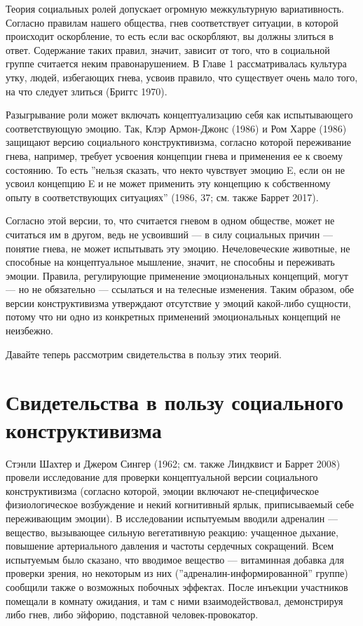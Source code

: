 \documentclass[11pt]{book}
\begin{document}
Теория социальных ролей допускает огромную межкультурную вариативность. Согласно правилам нашего общества, гнев соответствует ситуации, в которой происходит оскорбление, то есть если вас оскорбляют, вы должны злиться в ответ. Содержание таких правил, значит, зависит от того, что в социальной группе считается неким правонарушением. В Главе 1 рассматривалась культура утку, людей, избегающих гнева, усвоив правило, что существует очень мало того, на что следует злиться (Бриггс 1970).

Разыгрывание роли может включать концептуализацию себя как испытывающего соответствующую эмоцию. Так, Клэр Армон-Джонс (1986) и Ром Харре (1986) защищают версию социального конструктивизма, согласно которой переживание гнева, например, требует усвоения концепции гнева и применения ее к своему состоянию. То есть ''нельзя сказать, что некто чувствует эмоцию E, если он не усвоил концепцию E и не может применить эту концепцию к собственному опыту в соответствующих ситуациях'' (1986, 37; см. также Баррет 2017).

Согласно этой версии, то, что считается гневом в одном обществе, может не считаться им в другом, ведь не усвоивший --- в силу социальных причин --- понятие гнева, не может испытывать эту эмоцию. Нечеловеческие животные, не способные на концептуальное мышление, значит, не способны и переживать эмоции. Правила, регулирующие применение эмоциональных концепций, могут --- но не обязательно --- ссылаться и на телесные изменения. Таким образом, обе версии конструктивизма утверждают отсутствие у эмоций какой-либо сущности, потому что ни одно из конкретных применений эмоциональных концепций не неизбежно.

Давайте теперь рассмотрим свидетельства в пользу этих теорий.

\section{Свидетельства в пользу социального конструктивизма}

Стэнли Шахтер и Джером Сингер (1962; см. также Линдквист и Баррет 2008) провели исследование для проверки концептуальной версии социального конструктивизма (согласно которой, эмоции включают не-специфическое физиологическое возбуждение и некий когнитивный ярлык, приписываемый себе переживающим эмоции). В исследовании испытуемым вводили адреналин --- вещество, вызывающее сильную вегетативную реакцию: учащенное дыхание, повышение артериального давления и частоты сердечных сокращений. Всем испытуемым было сказано, что вводимое вещество --- витаминная добавка для проверки зрения, но некоторым из них (''адреналин-информированной'' группе) сообщили также о возможных побочных эффектах. После инъекции участников помещали в комнату ожидания, и там с ними взаимодействовал, демонстрируя либо гнев, либо эйфорию, подставной человек-провокатор.
\end{document}
